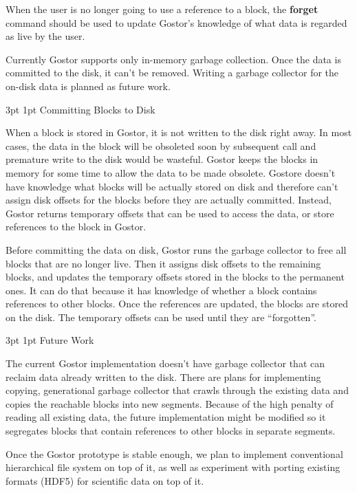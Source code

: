 \documentclass[11pt]{p9article}
\makeatletter
\renewcommand\section{\@startsection {section}{1}{\z@} {3pt} {1pt} {\normalfont\normalsize\bfseries}}
\renewcommand\subsection{\@startsection {subsection}{1}{\z@} {3pt} {1pt} {\normalfont\normalsize\bfseries}}
\makeatother
\begin{document}
When the user is no longer going to use a reference to a block, the
{\bfseries forget} command should be used to update Gostor's knowledge
of what data is regarded as live by the user.

Currently Gostor supports only in-memory garbage collection. Once the
data is committed to the disk, it can't be removed. Writing a garbage
collector for the on-disk data is planned as future work.

\subsection{Committing Blocks to Disk}

When a block is stored in Gostor, it is not written to the disk right
away. In most cases, the data in the block will be obsoleted soon by
subsequent call and premature write to the disk would be wasteful.
Gostor keeps the blocks in memory for some time to allow the data to
be made obsolete. Gostore doesn't have knowledge what blocks will be
actually stored on disk and therefore can't assign disk offsets for
the blocks before they are actually committed. Instead, Gostor returns
temporary offsets that can be used to access the data, or store
references to the block in Gostor.

Before committing the data on disk, Gostor runs the garbage collector
to free all blocks that are no longer live. Then it assigns disk
offsets to the remaining blocks, and updates the temporary offsets
stored in the blocks to the permanent ones. It can do that because it
has knowledge of whether a block contains references to other blocks. Once the
references are updated, the blocks are stored on the disk. The
temporary offsets can be used until they are ``forgotten''.

\section{Future Work}

The current Gostor implementation doesn't have garbage collector that
can reclaim data already written to the disk. There are plans for
implementing copying, generational garbage collector that crawls
through the existing data and copies the reachable blocks into new
segments. Because of the high penalty of reading all existing data,
the future implementation might be modified so it segregates blocks
that contain references to other blocks in separate segments.

Once the Gostor prototype is stable enough, we plan to implement
conventional hierarchical file system on top of it, as well as
experiment with porting existing formats (HDF5) for scientific data on
top of it.



\end{document}
